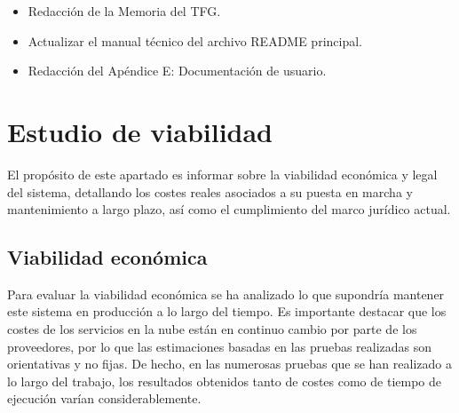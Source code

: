 \begin{itemize}
    \item Redacción de la Memoria del TFG.
    \item Actualizar el manual técnico del archivo README principal.
    \item Redacción del Apéndice E: Documentación de usuario.
\end{itemize}

\section{Estudio de viabilidad}
El propósito de este apartado es informar sobre la viabilidad económica y legal del sistema, detallando los costes reales asociados a su puesta en marcha y mantenimiento a largo plazo, así como el cumplimiento del marco jurídico actual.
 
\subsection{Viabilidad económica}
Para evaluar la viabilidad económica se ha analizado lo que supondría mantener este sistema en producción a lo largo del tiempo. Es importante destacar que los costes de los servicios en la nube están en continuo cambio por parte de los proveedores, por lo que las estimaciones basadas en las pruebas realizadas son orientativas y no fijas. De hecho, en las numerosas pruebas que se han realizado a lo largo del trabajo, los resultados obtenidos tanto de costes como de tiempo de ejecución varían considerablemente.


